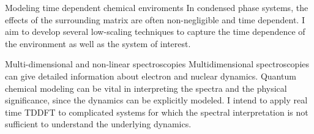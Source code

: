 


\begin{cventries}

\vspace{0.6mm}
\cventry
{} %
{Modeling time dependent chemical enviroments} %
{} %
{} %
{ %
		\qquad In condensed phase systems, the effects of the surrounding 
    matrix are often non-negligible and time dependent. I aim to develop
	several low-scaling techniques to capture the time dependence of the
	environment as well as the system of interest.
}


\vspace{1.1mm}
\cventry
{} %
{Multi-dimensional and non-linear spectroscopies} %
{} %
{} %
{ \qquad Multidimensional spectroscopies can give detailed
information about electron and nuclear dynamics. Quantum chemical modeling can
be vital in interpreting the spectra and the physical significance, since the
dynamics can be explicitly modeled. I intend to apply real time TDDFT to
complicated systems for which the spectral interpretation is not sufficient to
understand the underlying dynamics.} %



\end{cventries}
